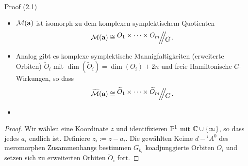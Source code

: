\begin{ex}
Proof (2.1)
\end{ex}
\begin{prop}
\begin{itemize}
\item
{}
$\mathcal M(\textbf a)$ ist isomorph zu dem komplexen symplektischem Quotienten
\[
\mathcal M(\textbf a)\cong\symplquot{O_1\times\dots\times O_m}{G} \,.
\]
\item
{}
Analog gibt es komplexe symplektische Mannigfaltigkeiten (erweiterte Orbiten)
$\tilde O_i$ mit $\dim(\tilde O_i)=\dim(O_i)+2n$ und freie Hamiltonische
$G$-Wirkungen, so dass
\[
\widetilde{\mathcal M}(\textbf a)\cong
\symplquot{\tilde O_1\times\dots\times\tilde O_m}{G} \,.
\]
\item \TODO[Unterpunkt 3]
\end{itemize}
\end{prop}
\begin{proof}
Wir wählen eine Koordinate $z$ und identifizieren $\P^1$ mit
$\C\cup\{\infty\}$, so dass jedes $a_i$ endlich ist.
Definiere $z_i:=z-a_i$.
Die gewählten Keime $d-{}^iA^0$ des meromorphen Zusammenhangs bestimmen
$G_{k_i}$ koadjunggierte Orbiten $O_i$ und setzen sich zu erweiterten Orbiten
$\tilde O_i$ fort.
\begin{comment}
Setze $O_i$ als den koadjunggierten Orbit durch den Punkt von $\mathfrak
g_k^*$, welcher durch den Hauptteil von ${}^iA^0$ \comm{ in (5) } gegeben ist.
Analog bestimmt der irreguläre Teil von ${}^iA^0$ einen Punkt in $\mathfrak
b_{k_i}^*$ und $\tilde O_i$ ist der erwieterte Orbit assoziiert zu dem
$B_{k_i}$ koadjunggierten Orbit durch den Punkt
\end{comment}
\end{proof}

